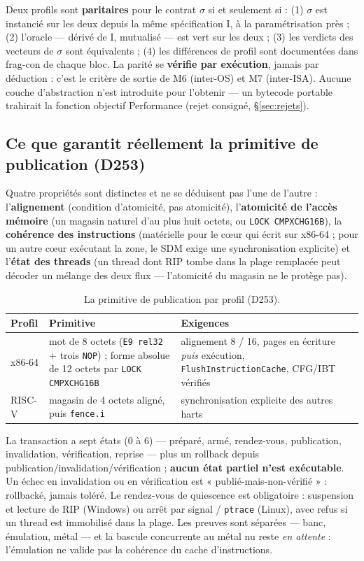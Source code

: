 Deux profils sont \textbf{paritaires} pour le contrat $\sigma$ si et seulement si :
(1) $\sigma$ est instancié sur les deux depuis la même spécification I, à la
paramétrisation près ; (2) l’oracle — dérivé de I, mutualisé — est vert sur les deux ;
(3) les verdicts des vecteurs de $\sigma$ sont équivalents ; (4) les différences de profil
sont documentées dans frag-con de chaque bloc. La parité se \textbf{vérifie par
exécution}, jamais par déduction : c’est le critère de sortie de M6 (inter-OS) et M7
(inter-ISA). Aucune couche d’abstraction n’est introduite pour l’obtenir — un bytecode
portable trahirait la fonction objectif Performance (rejet consigné, §\ref{sec:rejets}).


\subsection{Ce que garantit réellement la primitive de publication (D253)}\label{sec:primitives}

Quatre propriétés sont distinctes et ne se déduisent pas l’une de l’autre : l’\textbf{alignement}
(condition d’atomicité, pas atomicité), l’\textbf{atomicité de l’accès mémoire} (un magasin naturel d’au
plus huit octets, ou \texttt{LOCK CMPXCHG16B}), la \textbf{cohérence des instructions} (matérielle pour le
cœur qui écrit sur x86-64 ; pour un autre cœur exécutant la zone, le SDM exige une synchronisation
explicite) et l’\textbf{état des threads} (un thread dont RIP tombe dans la plage remplacée peut décoder
un mélange des deux flux — l’atomicité du magasin ne le protège pas).

\begin{table}[htbp]
\centering\small
\caption{La primitive de publication par profil (D253).}
\label{tab:publication}
\begin{tabularx}{\textwidth}{@{}l Y Y@{}}
\toprule
\textbf{Profil} & \textbf{Primitive} & \textbf{Exigences} \\
\midrule
x86-64 & mot de 8 octets (\texttt{E9 rel32} + trois \texttt{NOP}) ; forme absolue de 12 octets par \texttt{LOCK CMPXCHG16B} & alignement 8 / 16, pages en écriture \emph{puis} exécution, \texttt{FlushInstructionCache}, CFG/IBT vérifiés \\
RISC-V & magasin de 4 octets aligné, puis \texttt{fence.i} & synchronisation explicite des autres harts \\
\bottomrule
\end{tabularx}
\end{table}

La transaction a sept états (0 à 6) — préparé, armé, rendez-vous, publication, invalidation, vérification,
reprise — plus un rollback depuis publication/invalidation/vérification ; \textbf{aucun état partiel
n’est exécutable}. Un échec en invalidation ou en vérification est « publié-mais-non-vérifié » :
rollbacké, jamais toléré. Le rendez-vous de quiescence est obligatoire : suspension et lecture de RIP
(Windows) ou arrêt par signal / \texttt{ptrace} (Linux), avec refus si un thread est immobilisé dans la
plage. Les preuves sont séparées — banc, émulation, métal — et la bascule concurrente au métal nu reste
\emph{en attente} : l’émulation ne valide pas la cohérence du cache d’instructions.

